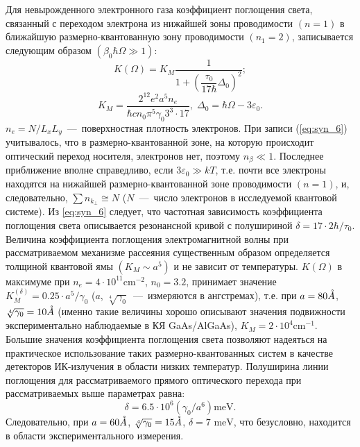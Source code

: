 Для невырожденного электронного газа коэффициент поглощения света, связанный с переходом электрона из нижайшей зоны проводимости $(n=1)$ в ближайшую размерно-квантованную зону проводимости $(n_1=2)$, записывается следующим образом $(\beta _0\hbar \Omega \gg 1)$:
\begin{equation} \label{eq:syn_6}
K(\Omega) = K_M \frac{1}{1+\left(\dfrac{\tau_0 }{17 \hbar} \Delta_0 \right)^2 } ;
\end{equation} 
\[
K_M =\frac{2^{12} e^2 a^5 n_e }{\hbar cn_0 \pi^5 \gamma_0 3^3 \cdot 17}, \;
\Delta_0 =\hbar \Omega -3\varepsilon_0.
\]
$n_e =N/L_x L_y $~---~поверхностная плотность электронов. При записи (\ref{eq:syn_6}) учитывалось, что в размерно-квантованной зоне, на которую происходит оптический переход носителя, электронов нет, поэтому $n_{\beta } \ll 1$. Последнее приближение вполне справедливо, если  $3\varepsilon_0 \gg kT$, т.е. почти все электроны находятся на нижайшей размерно-квантованной зоне проводимости $(n=1)$, и, следовательно, $\sum n_{k_{\bot } } \cong N$ ($N$~---~число электронов в исследуемой квантовой системе). Из \eqref{eq:syn_6} следует, что частотная зависимость коэффициента поглощения света описывается резонансной кривой с полушириной  $\delta =17\cdot 2\hbar /\tau_0 $. Величина коэффициента поглощения электромагнитной волны при рассматриваемом механизме рассеяния существенным образом определяется толщиной квантовой ямы $\left(K_M \sim a^5 \right)$ и не зависит от температуры. $K\left(\Omega \right)$  в максимуме при $n_e =4\cdot 10^{11} \text{cm}^{-2} $, $n_0 = 3.2$,   принимает значение   $K_M^{\left(\delta \right)} =0.25\cdot a^5 /\gamma_0 $ ($a$, $\sqrt[4]{\gamma_0}$~--–~измеряются в ангстремах), т.е. при  $a = 80 \AA$,  $\sqrt[4]{\gamma_0} = 10 \AA$ (именно такие величины хорошо описывают значения подвижности   экспериментально наблюдаемые в КЯ GaAs/AlGaAs), $K_M =2\cdot 10^4 \text{cm}^{-1} $. Большие значения коэффициента поглощения света позволяют надеяться на практическое использование таких размерно-квантованных систем в качестве детекторов ИК-излучения в области низких температур. Полуширина линии поглощения для рассматриваемого прямого оптического перехода при рассматриваемых выше параметрах равна:
\[
\delta =6.5\cdot 10^6 \left(\gamma_0 /a^6 \right)\text{meV}.
\]
Следовательно, при  $a = 60 \AA$,  $\sqrt[4]{\gamma_0} = 15 \AA$,  $\delta = 7 \text{ meV}$, что безусловно, находится в области экспериментального измерения.

